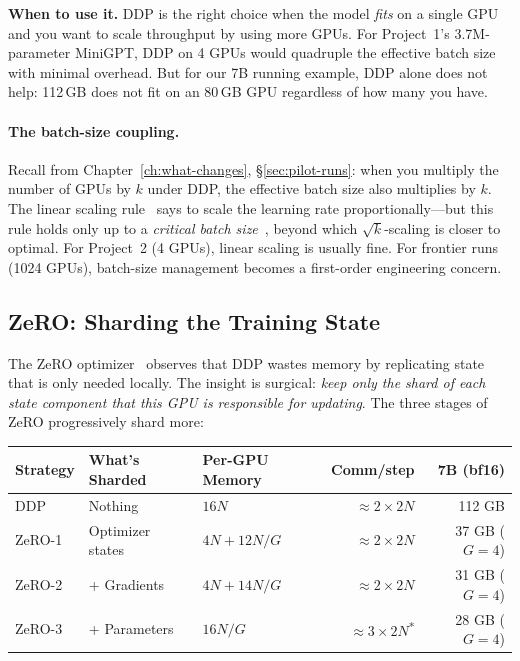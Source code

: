 \textbf{When to use it.} DDP is the right choice when the model \emph{fits} on a single GPU and you want to scale throughput by using more GPUs. For Project~1's 3.7M-parameter MiniGPT, DDP on 4 GPUs would quadruple the effective batch size with minimal overhead. But for our 7B running example, DDP alone does not help: 112\,GB does not fit on an 80\,GB GPU regardless of how many you have.

\paragraph{The batch-size coupling.} Recall from Chapter~\ref{ch:what-changes}, \S\ref{sec:pilot-runs}: when you multiply the number of GPUs by $k$ under DDP, the effective batch size also multiplies by $k$. The linear scaling rule~\cite{goyal2017imagenet} says to scale the learning rate proportionally---but this rule holds only up to a \emph{critical batch size}~\cite{mccandlish2018empirical}, beyond which $\sqrt{k}$-scaling is closer to optimal. For Project~2 (4 GPUs), linear scaling is usually fine. For frontier runs (1024 GPUs), batch-size management becomes a first-order engineering concern.


\subsection{ZeRO: Sharding the Training State}

The ZeRO optimizer~\cite{rajbhandari2020zero} observes that DDP wastes memory by replicating state that is only needed locally. The insight is surgical: \emph{keep only the shard of each state component that this GPU is responsible for updating}. The three stages of ZeRO progressively shard more:

\begin{center}
\begin{tabularx}{\textwidth}{@{}p{2cm}XXrr@{}}
\toprule
\textbf{Strategy} & \textbf{What's Sharded} & \textbf{Per-GPU Memory} & \textbf{Comm/step} & \textbf{7B (bf16)} \\
\midrule
DDP & Nothing & $16N$ & $\approx 2 \times 2N$ & 112 GB \\
ZeRO-1 & Optimizer states & $4N + 12N/G$ & $\approx 2 \times 2N$ & 37 GB ($G\!=\!4$) \\
ZeRO-2 & + Gradients & $4N + 14N/G$ & $\approx 2 \times 2N$ & 31 GB ($G\!=\!4$) \\
ZeRO-3 & + Parameters & $16N/G$ & $\approx 3 \times 2N$\textsuperscript{*} & 28 GB ($G\!=\!4$) \\
\bottomrule
\end{tabularx}
\end{center}

